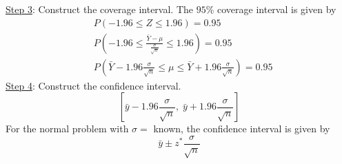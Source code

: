 \underline{Step 3}: Construct the coverage interval. The $ 95\% $ coverage interval is given by
\begin{align*}
     & P\left( -1.96\leqslant Z\leqslant 1.96 \right)=0.95                                                                 \\
     & P\left( -1.96\leqslant \frac{\bar{Y}-\mu}{\frac{\sigma}{\sqrt{n}}}\leqslant 1.96  \right)=0.95                      \\
     & P\left( \bar{Y}-1.96 \frac{\sigma}{\sqrt{n}}\leqslant \mu\leqslant \bar{Y}+1.96 \frac{\sigma}{\sqrt{n}}\right)=0.95
\end{align*}
\underline{Step 4}: Construct the confidence interval.
\[ \left[ \bar{y}-1.96 \frac{\sigma}{\sqrt{n}} ,\; \bar{y}+1.96 \frac{\sigma}{\sqrt{n}}  \right] \]
For the normal problem with $ \sigma= $ known, the confidence interval is given by
\[ \bar{y}\pm z^* \frac{\sigma}{\sqrt{n}}  \]
